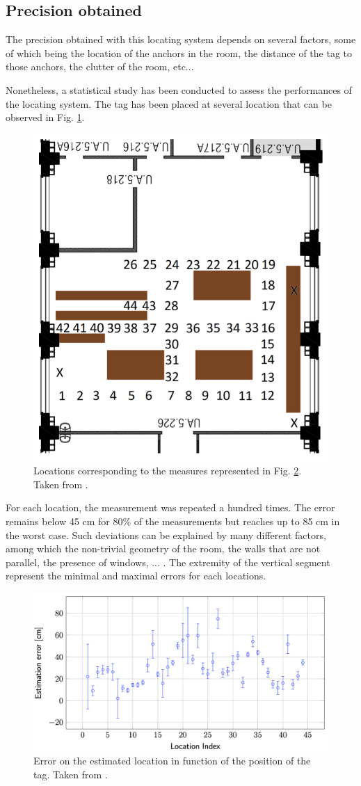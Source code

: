 \subsection{Precision obtained}

The precision obtained with this locating system depends on several factors, some of which being the location of the anchors in the room, the distance of the tag to those anchors, the clutter of the room, etc...
\vspace{2mm}

Nonetheless, a statistical study has been conducted to assess the performances of the locating system. The tag has been placed at several location that can be observed in Fig. \ref{fig:test_map}.

\begin{figure}[H]
	\centering
	\includegraphics[width=.35\linewidth]{Images/test_map.png}
	\caption{Locations corresponding to the measures represented in Fig. \ref{fig:test_result}. Taken from \cite{hannotier2019indoor}.}
	\label{fig:test_map}
\end{figure}

For each location, the measurement was repeated a hundred times. The error remains below 45 cm for 80\% of the measurements but reaches up to 85 cm in the worst case. Such deviations can be explained by many different factors, among which the non-trivial geometry of the room, the walls that are not parallel, the presence of windows, ... \cite{hannotier2019indoor}. The extremity of the vertical segment represent the minimal and maximal errors for each locations.
\vspace{2mm}

\begin{figure}[H]
	\centering
	\includegraphics[width=.8\linewidth]{Images/test_fig.png}
	\caption{Error on the estimated location in function of the position of the tag. Taken from \cite{hannotier2019indoor}.}
	\label{fig:test_result}
\end{figure}

